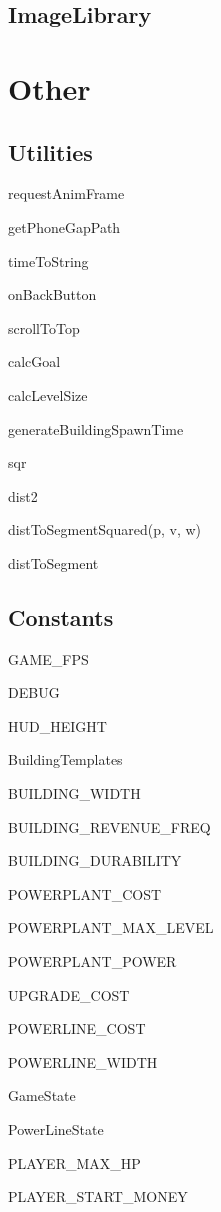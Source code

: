 	\subsection*{ImageLibrary}

	\clearpage

\section{Other}

\subsection*{Utilities}

	requestAnimFrame

	getPhoneGapPath

	timeToString

	onBackButton

	scrollToTop

	calcGoal

	calcLevelSize

	generateBuildingSpawnTime

	sqr

	dist2

	distToSegmentSquared(p, v, w)

	distToSegment


\subsection*{Constants}
	
	GAME\_FPS

	DEBUG

	HUD\_HEIGHT

	BuildingTemplates

	BUILDING\_WIDTH

	BUILDING\_REVENUE\_FREQ

	BUILDING\_DURABILITY

	POWERPLANT\_COST

	POWERPLANT\_MAX\_LEVEL

	POWERPLANT\_POWER

	UPGRADE\_COST

	POWERLINE\_COST

	POWERLINE\_WIDTH

	GameState

	PowerLineState

	PLAYER\_MAX\_HP

	PLAYER\_START\_MONEY
